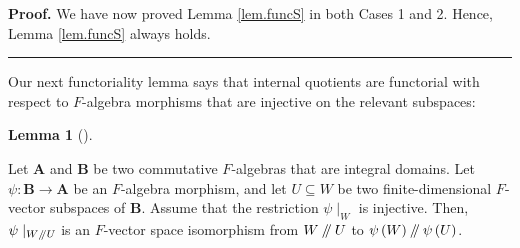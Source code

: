 \documentclass[numbers=enddot,12pt,final,onecolumn,notitlepage]{scrartcl}%
\numberwithin{exer}{section}
\theoremstyle{definition}
\newtheorem{lem}[theo]{Lemma}
\newenvironment{lemma}[1][]
{\begin{lem}[#1]\begin{leftbar}}
{\end{leftbar}\end{lem}}
\newenvironment{proof}[1][Proof]{\noindent\textbf{#1.} }{\ \rule{0.5em}{0.5em}}
\newcommand{\sslash}{\mathbin{/\mkern-5mu/}}
\theoremstyle{plainsl}
\begin{document}
\begin{proof}
We have now proved Lemma \ref{lem.funcS} in both Cases 1 and 2. Hence, Lemma
\ref{lem.funcS} always holds.
\end{proof}

Our next functoriality lemma says that internal quotients are functorial with
respect to $F$-algebra morphisms that are injective on the relevant subspaces:

\begin{lemma}
\label{lem.func//}Let $\mathbf{A}$ and $\mathbf{B}$ be two commutative
$F$-algebras that are integral domains. Let $\psi:\mathbf{B}\rightarrow
\mathbf{A}$ be an $F$-algebra morphism, and let $U\subseteq W$ be two
finite-dimensional $F$-vector subspaces of $\mathbf{B}$. Assume that the
restriction $\psi\mid_{W}$ is injective. Then, $\psi\mid_{W\sslash U}$ is an
$F$-vector space isomorphism from $W\sslash U$ to $\psi\left(  W\right)
\sslash\psi\left(  U\right)  $.
\end{lemma}
\end{document}
